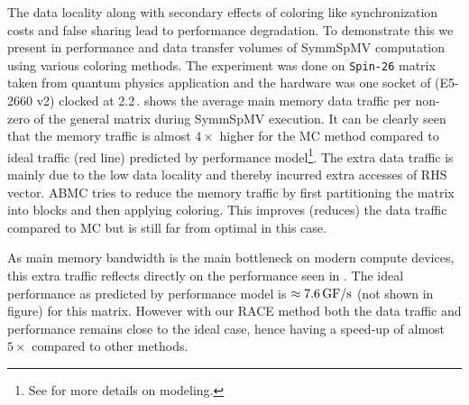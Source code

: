 The data locality along with secondary effects of coloring like 
synchronization costs and false sharing lead to performance degradation.
To demonstrate this we present in  performance and 
data transfer volumes of \acrshort{SymmSpMV} computation using various coloring methods.
The experiment was done on \texttt{Spin-26} \cite{Spin} matrix taken from quantum physics application
and the hardware was one socket of \Intel \IVB (E5-2660 v2) clocked at 2.2\,\GHZ.
 shows the average main memory data traffic per non-zero  of the 
general matrix during \acrshort{SymmSpMV} execution. It can be clearly seen that 
the memory traffic is almost  $4 \times$ higher 
for the \acrshort{MC} method compared to ideal traffic (red line) predicted
by performance model\footnote{See  for more details on modeling.}.
The extra data traffic is mainly due to the low data locality and thereby incurred 
extra accesses of RHS vector. 
\Acrfull{ABMC} tries to reduce the memory traffic by first partitioning the matrix
into blocks and then applying coloring. This improves (reduces) the data traffic compared 
to \acrshort{MC} but is still far from optimal in this case. 

As main memory bandwidth is the main bottleneck on modern compute devices,
 this extra traffic reflects directly on the performance 
 seen in . The ideal 
 performance as predicted by performance model is $\approx 7.6\,\mbox{GF/s}$ (not shown in figure)
 for this matrix. 
 However with our \acrshort{RACE} method both the data traffic and performance 
 remains close to the ideal case, hence having a speed-up of almost
  $5\times$ compared to other methods.

